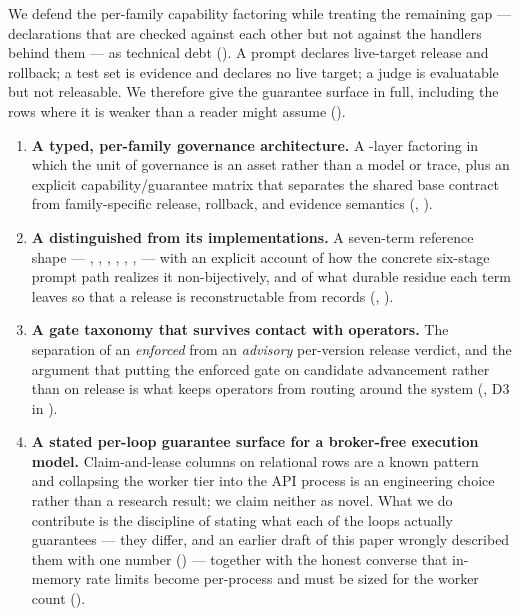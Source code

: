 We defend the per-family capability factoring while treating the remaining gap ---
declarations that are checked against each other but not against the handlers
behind them --- as technical debt (). A prompt
declares live-target release and rollback; a test set is evidence and declares no
live target; a judge is evaluatable but not releasable. We therefore give the
guarantee surface in full, including the rows where it is weaker than a reader
might assume ().

\begin{enumerate}
\item \textbf{A typed, per-family governance architecture.} A
\statLayersW{}-layer factoring in which the unit of governance is an asset rather
than a model or trace, plus an explicit capability/guarantee matrix that separates
the shared base contract from family-specific release, rollback, and evidence
semantics (, ).

\item \textbf{A \chainname{} distinguished from its implementations.} A
seven-term reference shape --- \cSignal{}, \cEvidence{}, \cCandidate{},
\cMeasure{}, \cDecision{}, \cRelease{}, \cTrace{} --- with an explicit account of
how the concrete six-stage prompt path realizes it non-bijectively, and of what
durable residue each term leaves so that a release is reconstructable from records
(, ).

\item \textbf{A gate taxonomy that survives contact with operators.} The
separation of an \emph{enforced} \advgate{} from an \emph{advisory} per-version
release verdict, and the argument that putting the enforced gate on candidate
advancement rather than on release is what keeps operators from routing around the
system (, D3 in ).

\item \textbf{A stated per-loop guarantee surface for a broker-free execution
model.} Claim-and-lease columns on relational rows are a known
pattern~\cite{kleppmann2017ddia} and collapsing the worker tier into the API
process is an engineering choice rather than a research result; we claim neither as
novel. What we do contribute is the discipline of stating what each of the
\statLoopsW{} loops actually guarantees --- they differ, and an earlier draft of
this paper wrongly described them with one number () --- together
with the honest converse that in-memory rate limits become per-process and must be
sized for the worker count ().


\end{enumerate}
